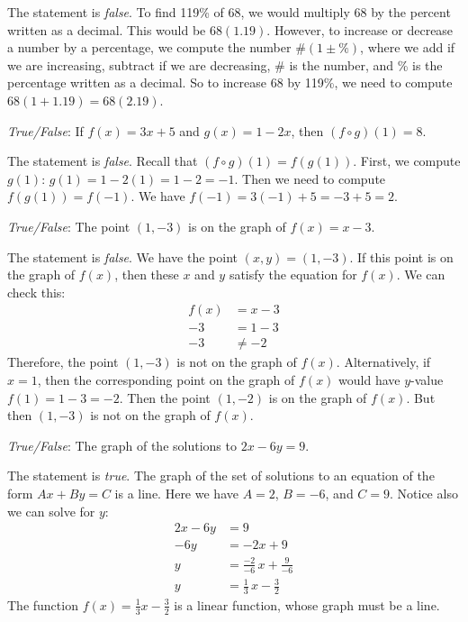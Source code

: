 \documentclass[11pt,letterpaper]{article}
\begin{document}
\sol The statement is \textit{false}. To find 119\% of 68, we would multiply 68 by the percent written as a decimal. This would be $68(1.19)$. However, to increase or decrease a number by a percentage, we compute the number $\#(1 \pm \%)$, where we add if we are increasing, subtract if we are decreasing, $\#$ is the number, and \% is the percentage written as a decimal. So to increase 68 by 119\%, we need to compute $68(1 + 1.19)= 68(2.19)$. \pvspace{1.5cm}



\newpage



\quizsol \textit{True/False}: If $f(x)= 3x + 5$ and $g(x)= 1 - 2x$, then $(f \circ g)(1)= 8$. \pspace

\sol The statement is \textit{false}. Recall that $(f \circ g)(1)= f(g(1))$. First, we compute $g(1)$: $g(1)= 1 - 2(1)= 1 - 2= -1$. Then we need to compute $f(g(1))= f(-1)$. We have $f(-1)= 3(-1) + 5= -3 + 5= 2$. \pvspace{1.5cm}



\quizsol \textit{True/False}: The point $(1, -3)$ is on the graph of $f(x)= x - 3$. \pspace

\sol The statement is \textit{false}. We have the point $(x, y)= (1, -3)$. If this point is on the graph of $f(x)$, then these $x$ and $y$ satisfy the equation for $f(x)$. We can check this:
	\[
	\begin{aligned}
	f(x)&= x - 3 \\
	-3&= 1 - 3 \\
	-3&\neq -2
	\end{aligned}
	\]
Therefore, the point $(1, -3)$ is not on the graph of $f(x)$. Alternatively, if $x= 1$, then the corresponding point on the graph of $f(x)$ would have $y$-value $f(1)= 1 - 3= -2$. Then the point $(1, -2)$ is on the graph of $f(x)$. But then $(1, -3)$ is not on the graph of $f(x)$. \pvspace{1.5cm}



\quizsol \textit{True/False}: The graph of the solutions to $2x - 6y= 9$. \pspace

\sol The statement is \textit{true}. The graph of the set of solutions to an equation of the form $Ax + By= C$ is a line. Here we have $A= 2$, $B= -6$, and $C= 9$. Notice also we can solve for $y$:
	\[
	\begin{aligned}
	2x - 6y&= 9 \\
	-6y&= -2x + 9 \\
	y&= \frac{-2}{-6}\,x + \frac{9}{-6} \\
	y&= \frac{1}{3}\,x - \frac{3}{2}
	\end{aligned}
	\]
The function $f(x)= \frac{1}{3}x - \frac{3}{2}$ is a linear function, whose graph must be a line. \pvspace{1.3cm}
\end{document}
